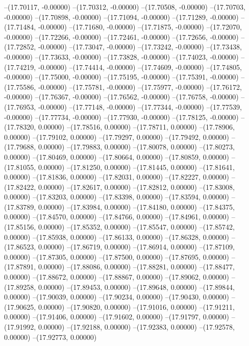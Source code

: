 --(17.70117, -0.00000)
--(17.70312, -0.00000)
--(17.70508, -0.00000)
--(17.70703, -0.00000)
--(17.70898, -0.00000)
--(17.71094, -0.00000)
--(17.71289, -0.00000)
--(17.71484, -0.00000)
--(17.71680, -0.00000)
--(17.71875, -0.00000)
--(17.72070, -0.00000)
--(17.72266, -0.00000)
--(17.72461, -0.00000)
--(17.72656, -0.00000)
--(17.72852, -0.00000)
--(17.73047, -0.00000)
--(17.73242, -0.00000)
--(17.73438, -0.00000)
--(17.73633, -0.00000)
--(17.73828, -0.00000)
--(17.74023, -0.00000)
--(17.74219, -0.00000)
--(17.74414, -0.00000)
--(17.74609, -0.00000)
--(17.74805, -0.00000)
--(17.75000, -0.00000)
--(17.75195, -0.00000)
--(17.75391, -0.00000)
--(17.75586, -0.00000)
--(17.75781, -0.00000)
--(17.75977, -0.00000)
--(17.76172, -0.00000)
--(17.76367, -0.00000)
--(17.76562, -0.00000)
--(17.76758, -0.00000)
--(17.76953, -0.00000)
--(17.77148, -0.00000)
--(17.77344, -0.00000)
--(17.77539, -0.00000)
--(17.77734, -0.00000)
--(17.77930, -0.00000)
--(17.78125, -0.00000)
--(17.78320, 0.00000)
--(17.78516, 0.00000)
--(17.78711, 0.00000)
--(17.78906, 0.00000)
--(17.79102, 0.00000)
--(17.79297, 0.00000)
--(17.79492, 0.00000)
--(17.79688, 0.00000)
--(17.79883, 0.00000)
--(17.80078, 0.00000)
--(17.80273, 0.00000)
--(17.80469, 0.00000)
--(17.80664, 0.00000)
--(17.80859, 0.00000)
--(17.81055, 0.00000)
--(17.81250, 0.00000)
--(17.81445, 0.00000)
--(17.81641, 0.00000)
--(17.81836, 0.00000)
--(17.82031, 0.00000)
--(17.82227, 0.00000)
--(17.82422, 0.00000)
--(17.82617, 0.00000)
--(17.82812, 0.00000)
--(17.83008, 0.00000)
--(17.83203, 0.00000)
--(17.83398, 0.00000)
--(17.83594, 0.00000)
--(17.83789, 0.00000)
--(17.83984, 0.00000)
--(17.84180, 0.00000)
--(17.84375, 0.00000)
--(17.84570, 0.00000)
--(17.84766, 0.00000)
--(17.84961, 0.00000)
--(17.85156, 0.00000)
--(17.85352, 0.00000)
--(17.85547, 0.00000)
--(17.85742, 0.00000)
--(17.85938, 0.00000)
--(17.86133, 0.00000)
--(17.86328, 0.00000)
--(17.86523, 0.00000)
--(17.86719, 0.00000)
--(17.86914, 0.00000)
--(17.87109, 0.00000)
--(17.87305, 0.00000)
--(17.87500, 0.00000)
--(17.87695, 0.00000)
--(17.87891, 0.00000)
--(17.88086, 0.00000)
--(17.88281, 0.00000)
--(17.88477, 0.00000)
--(17.88672, 0.00000)
--(17.88867, 0.00000)
--(17.89062, 0.00000)
--(17.89258, 0.00000)
--(17.89453, 0.00000)
--(17.89648, 0.00000)
--(17.89844, 0.00000)
--(17.90039, 0.00000)
--(17.90234, 0.00000)
--(17.90430, 0.00000)
--(17.90625, 0.00000)
--(17.90820, 0.00000)
--(17.91016, 0.00000)
--(17.91211, 0.00000)
--(17.91406, 0.00000)
--(17.91602, 0.00000)
--(17.91797, 0.00000)
--(17.91992, 0.00000)
--(17.92188, 0.00000)
--(17.92383, 0.00000)
--(17.92578, 0.00000)
--(17.92773, 0.00000)
